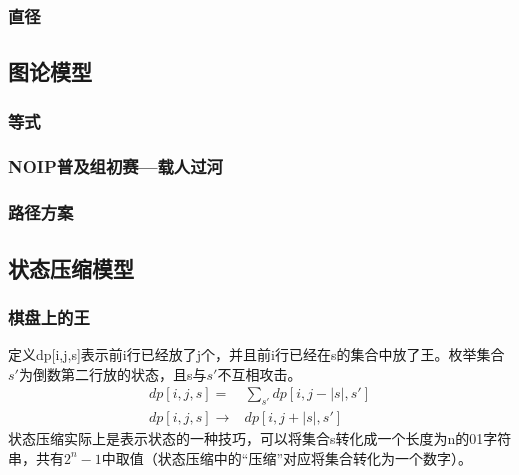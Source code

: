 \documentclass{article}
\begin{document}
\subsubsection{直径}
\subsection{图论模型}
\subsubsection{等式}
\subsubsection{NOIP普及组初赛---载人过河}
\subsubsection{路径方案}
\subsection{状态压缩模型}
\fi

\subsubsection{棋盘上的王}
定义dp[i,j,s]表示前i行已经放了j个，并且前i行已经在s的集合中放了王。枚举集合$s'$为倒数第二行放的状态，且s与$s'$不互相攻击。
\begin{equation*}
    \begin{aligned}
        dp[i,j,s]=&\sum_{s'}dp[i,j-|s|,s']\\
        dp[i,j,s]\to& dp[i,j+|s|,s']
    \end{aligned}
\end{equation*}
状态压缩实际上是表示状态的一种技巧，可以将集合s转化成一个长度为n的01字符串，共有$2^n-1$中取值（状态压缩中的“压缩”对应将集合转化为一个数字）。
\end{document}
